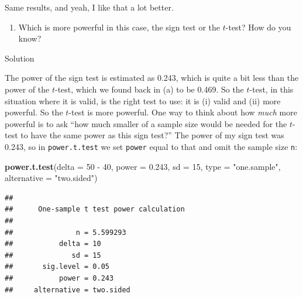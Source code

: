 \documentclass[]{tufte-book}
\newenvironment{Shaded}{}{}
\newcommand{\DataTypeTok}[1]{\textcolor[rgb]{0.56,0.13,0.00}{#1}}
\newcommand{\DecValTok}[1]{\textcolor[rgb]{0.25,0.63,0.44}{#1}}
\newcommand{\FloatTok}[1]{\textcolor[rgb]{0.25,0.63,0.44}{#1}}
\newcommand{\KeywordTok}[1]{\textcolor[rgb]{0.00,0.44,0.13}{\textbf{#1}}}
\newcommand{\NormalTok}[1]{#1}
\newcommand{\OperatorTok}[1]{\textcolor[rgb]{0.40,0.40,0.40}{#1}}
\newcommand{\StringTok}[1]{\textcolor[rgb]{0.25,0.44,0.63}{#1}}
\providecommand{\tightlist}{%
  \setlength{\itemsep}{0pt}\setlength{\parskip}{0pt}}
\theoremstyle{definition}
\theoremstyle{definition}
\theoremstyle{definition}
\theoremstyle{remark}
\begin{document}
Same results, and yeah, I like that a lot better.

\begin{enumerate}
\def\labelenumi{(\alph{enumi})}
\setcounter{enumi}{5}
\tightlist
\item
  Which is more powerful in this case, the sign test or the \(t\)-test?
  How do you know?
\end{enumerate}

Solution

The power of the sign test is estimated as 0.243, which is quite a bit
less than the power of the \(t\)-test, which we found back in (a) to be
0.469. So the \(t\)-test, in this situation where it is valid, is the
right test to use: it is (i) valid and (ii) more powerful. So the
\(t\)-test is more powerful. One way to think about how \emph{much} more
powerful is to ask ``how much smaller of a sample size would be needed
for the \(t\)-test to have the same power as this sign test?'' The power
of my sign test was 0.243, so in \texttt{power.t.test} we set
\texttt{power} equal to that and omit the sample size \texttt{n}:

\begin{Shaded}
\begin{Highlighting}[]
\KeywordTok{power.t.test}\NormalTok{(}\DataTypeTok{delta =} \DecValTok{50} \OperatorTok{-}\StringTok{ }\DecValTok{40}\NormalTok{, }\DataTypeTok{power =} \FloatTok{0.243}\NormalTok{, }\DataTypeTok{sd =} \DecValTok{15}\NormalTok{, }
    \DataTypeTok{type =} \StringTok{"one.sample"}\NormalTok{, }\DataTypeTok{alternative =} \StringTok{"two.sided"}\NormalTok{)}
\end{Highlighting}
\end{Shaded}

\begin{verbatim}
## 
##      One-sample t test power calculation 
## 
##               n = 5.599293
##           delta = 10
##              sd = 15
##       sig.level = 0.05
##           power = 0.243
##     alternative = two.sided
\end{verbatim}
\end{document}
